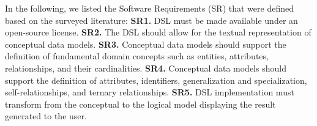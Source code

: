 \documentclass[a4paper,twoside,anonymous]{article}
\begin{document}
In the following, we listed the Software Requirements (SR) that were defined based on the surveyed literature: %
\textbf{SR1.} DSL must be made available under an open-source license.
\textbf{SR2.} The DSL should allow for the textual representation of conceptual data models.
\textbf{SR3.} Conceptual data models should support the definition of fundamental domain concepts such as entities, attributes, relationships, and their cardinalities.
\textbf{SR4.} Conceptual data models should support the definition of attributes, identifiers, generalization and specialization, self-relationships, and ternary relationships.
\textbf{SR5.} DSL implementation must transform from the conceptual to the logical model displaying the result generated to the user.


\end{document}

